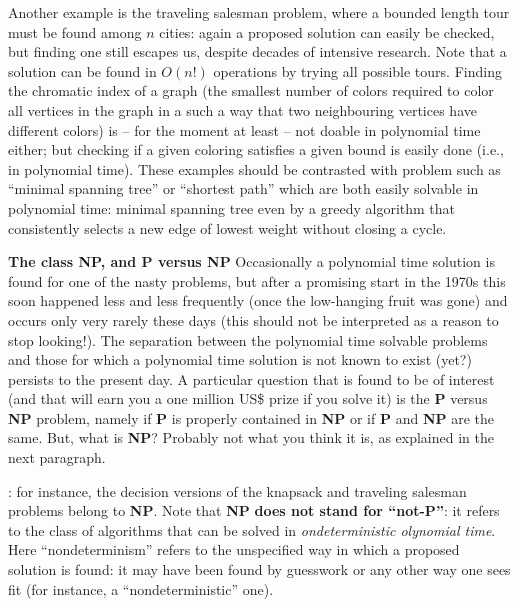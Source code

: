 \documentclass[titlepage]{article}
\theoremstyle{definition}
\numberwithin{equation}{subsection}
\numberwithin{remark}{subsection}
\begin{document}
Another example is the traveling salesman problem, where a bounded length tour must be found among $n$ cities: again a proposed solution can easily be checked, but finding one still escapes us, despite decades of intensive research.
Note that a solution can be found in $O(n!)$ operations by trying all possible tours.
Finding the chromatic index of a graph (the smallest number of colors required to color all vertices in the graph in a such a way that two neighbouring vertices have different colors) is -- for the moment at least -- not doable in polynomial time either; but checking if a given coloring satisfies a given bound is easily done (i.e., in polynomial time).
These examples should be contrasted with problem such as ``minimal spanning tree'' or ``shortest path'' which are both easily solvable in polynomial time: minimal spanning tree even by a greedy algorithm that consistently selects a new edge of lowest weight without closing a cycle.\\
\par\noindent
{\bf{The class {\bf{NP}}, and {\bf{P}} versus {\bf{NP}}}}
Occasionally a polynomial time solution is found for one of the nasty problems, but after a promising start in the 1970s this soon happened less and less frequently (once the low-hanging fruit was gone) and occurs only very rarely these days (this should not be interpreted as a reason to stop looking!).
The separation between the polynomial time solvable problems and those for which a polynomial time solution is not known to exist (yet?) persists to the present day.
A particular question that is found to be of interest (and that will earn you a one million US\$ prize if you solve it) is the {\bf P} versus {\bf NP} problem, namely if {\bf P} is properly contained in {\bf NP} or if {\bf P} and {\bf NP} are the same.
But, what is {\bf NP}? Probably not what you think it is, as explained in the next paragraph.

{}: for instance, the decision versions of the knapsack and traveling salesman problems belong to {\bf NP}.
Note that {\bf NP} {\bf does not stand for ``not-P''}: it refers to the class of algorithms that can be solved in \emph{{\color{red}{n}}ondeterministic {\color{red}{p}}olynomial time}.
Here ``nondeterminism'' refers to the unspecified way in which a proposed solution is found: it may have been found by guesswork or any other way one sees fit (for instance, a ``nondeterministic'' one).
\end{document}
